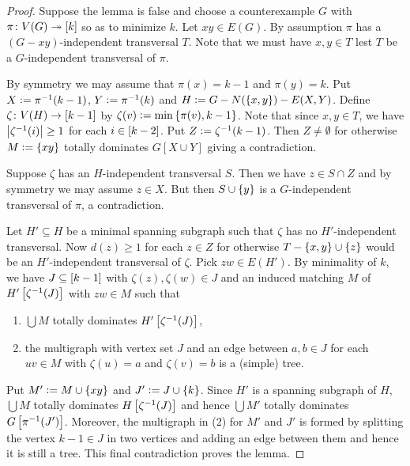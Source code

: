 \begin{proof}
Suppose the lemma is false and choose a counterexample $G$ with
$\pi\colon V(G) \twoheadrightarrow \left[k\right]$ so as to minimize $k$.  Let $xy \in E(G)$.
By assumption $\pi$ has a $(G-xy)$-independent transversal $T$.  Note that we
must have $x,y \in T$ lest $T$ be a $G$-independent transversal of $\pi$.

By symmetry we may assume that $\pi(x) = k-1$ and $\pi(y) = k$. Put $X
\mathrel{\mathop:}= \pi^{-1}(k-1)$, $Y \mathrel{\mathop:}= \pi^{-1}(k)$ and $H \mathrel{\mathop:}= G -
N(\left\{ x, y \right\}) - E(X,Y)$. Define $\zeta\colon V(H) \rightarrow \left[k-1\right]$ by $\zeta(v)
\mathrel{\mathop:}= \min\left\{ \pi(v), k-1 \right\}$. Note that since $x,y \in T$, we have
$\left|\zeta^{-1}(i)\right| \geq 1$ for each $i \in \left[k-2\right]$.  Put $Z \mathrel{\mathop:}=
\zeta^{-1}(k-1)$. Then $Z \neq \emptyset$ for otherwise $M \mathrel{\mathop:}= \left\{ xy \right\}$
totally dominates $G[X \cup Y]$ giving a contradiction.

Suppose $\zeta$ has an $H$-independent transversal $S$.  Then we have $z \in S
\cap Z$ and by symmetry we may assume $z \in X$.  But then $S \cup \left\{ y \right\}$ is
a $G$-independent transversal of $\pi$, a contradiction.

Let $H' \subseteq H$ be a minimal spanning subgraph such that $\zeta$ has no
$H'$-independent transversal.  Now $d(z) \geq 1$ for each $z \in Z$ for
otherwise $T - \left\{ x,y \right\} \cup \left\{ z \right\}$ would be an $H'$-independent transversal
of $\zeta$.  Pick $zw \in E(H')$.  By minimality of $k$, we have $J \subseteq
\left[k-1\right]$ with $\zeta(z), \zeta(w) \in J$ and an induced matching $M$ of
$H'\left[ \zeta^{-1}(J) \right]$ with $zw \in M$ such that
\begin{enumerate}
  \item $\bigcup M$ totally dominates $H'\left[ \zeta^{-1}(J) \right]$,
  \item the multigraph with vertex set $J$ and an edge between $a, b \in J$ for
  each $uv \in M$ with $\zeta(u) = a$ and $\zeta(v) = b$ is a (simple) tree.
\end{enumerate}

Put $M' \mathrel{\mathop:}= M \cup \left\{ xy \right\}$ and $J' \mathrel{\mathop:}= J \cup \left\{ k \right\}$.
Since $H'$ is a spanning subgraph of $H$, $\bigcup M$ totally dominates
$H\left[ \zeta^{-1}(J) \right]$ and hence $\bigcup M'$ totally dominates
$G\left[ \pi^{-1}(J') \right]$.  Moreover, the multigraph in (2) for $M'$ and $J'$
is formed by splitting the vertex $k-1 \in J$ in two vertices and adding an edge
between them and hence it is still a tree.  This final contradiction proves the
lemma.
\end{proof}


